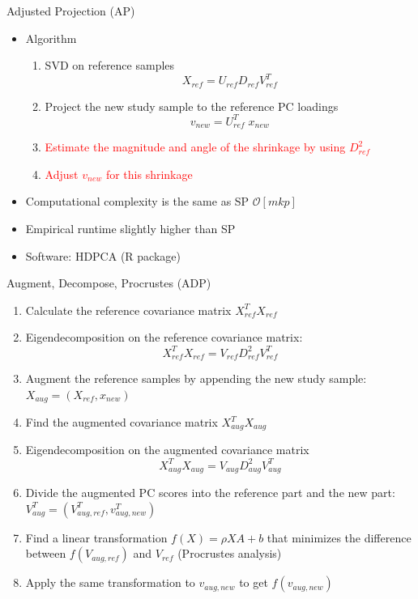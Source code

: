 \documentclass{beamer}
\newcommand{\bO}{\mathcal{O}}
\begin{document}
\begin{frame}{Adjusted Projection (AP)}
\begin{itemize}
\item Algorithm
    \begin{enumerate}
    \item SVD on reference samples
        \[
            X_{ref} = U_{ref} D_{ref} V_{ref}^T
        \]
    \item Project the new study sample to the reference PC loadings
        \[
           v_{new} = U_{ref}^T \; x_{new}
        \]
    \item \textcolor{red}{Estimate the magnitude and angle of the shrinkage by using $D_{ref}^2$}
    \item \textcolor{red}{Adjust $v_{new}$ for this shrinkage}
    \end{enumerate}
\item Computational complexity is the same as SP $\bO[mkp]$
\item Empirical runtime slightly higher than SP
\item Software: HDPCA (R package)
\end{itemize}
\end{frame}

\begin{frame}{Augment, Decompose, Procrustes (ADP)}
\begin{enumerate}
\item Calculate the reference covariance matrix $X_{ref}^T X_{ref}$
\item Eigendecomposition on the reference covariance matrix:
\[
    X_{ref}^T X_{ref} = V_{ref} D_{ref}^2 V_{ref}^T
\]
\item Augment the reference samples by appending the new study sample: $X_{aug} = (X_{ref}, x_{new})$
\item Find the augmented covariance matrix $X_{aug}^T X_{aug}$
\item Eigendecomposition on the augmented covariance matrix
\[
    X_{aug}^T X_{aug} = V_{aug} D_{aug}^2 V_{aug}^T
\]
\item Divide the augmented PC scores into the reference part and the new part: $V_{aug}^T = (V_{aug, ref}^T, v_{aug, new}^T)$
\item Find a linear transformation $f(X) = \rho XA + b$ that minimizes the difference between $f(V_{aug,ref})$ and $V_{ref}$ (Procrustes analysis)
\item Apply the same transformation to $v_{aug,new}$ to get $f(v_{aug,new})$
\end{enumerate}
\end{frame}
\end{document}
